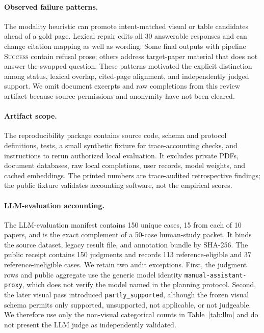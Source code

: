 \paragraph{Observed failure patterns.}
The modality heuristic can promote intent-matched visual or table candidates ahead of a gold page. Lexical repair edits all 30 answerable responses and can change citation mapping as well as wording. Some final outputs with pipeline \textsc{Success} contain refusal prose; others address target-paper material that does not answer the swapped question. These patterns motivated the explicit distinction among status, lexical overlap, cited-page alignment, and independently judged support. We omit document excerpts and raw completions from this review artifact because source permissions and anonymity have not been cleared.

\paragraph{Artifact scope.}
The reproducibility package contains source code, schema and protocol definitions, tests, a small synthetic fixture for trace-accounting checks, and instructions to rerun authorized local evaluation. It excludes private PDFs, document databases, raw local completions, user records, model weights, and cached embeddings. The printed numbers are trace-audited retrospective findings; the public fixture validates accounting software, not the empirical scores.

\paragraph{LLM-evaluation accounting.}
The LLM-evaluation manifest contains 150 unique cases, 15 from each of 10 papers, and is the exact complement of a 50-case human-study packet. It binds the source dataset, legacy result file, and annotation bundle by SHA-256. The public receipt contains 150 judgments and records 113 reference-eligible and 37 reference-ineligible cases. We retain two audit exceptions. First, the judgment rows and public aggregate use the generic model identity \texttt{manual-assistant-proxy}, which does not verify the model named in the planning protocol. Second, the later visual pass introduced \texttt{partly\_supported}, although the frozen visual schema permits only supported, unsupported, not applicable, or not judgeable. We therefore use only the non-visual categorical counts in Table~\ref{tab:llm} and do not present the LLM judge as independently validated.

\ifreleasetables

\else
\fi
